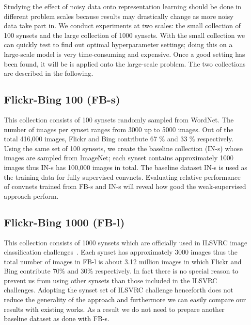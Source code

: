 \documentclass[preprint,12pt]{elsarticle}
\begin{document}
Studying the effect of noisy data onto representation learning should be done in different problem scales because results may drastically change as more noisy data take part in. We conduct experiments at two scales: the small collection of 100 synsets and the large collection of 1000 synsets. With the small collection we can quickly test to find out optimal hyperparameter settings; doing this on a large-scale model is very time-consuming and expensive. Once a good setting has been found, it will be is applied onto the large-scale problem. The two collections are described in the following.
\subsection{Flickr-Bing 100 (FB-s)} 
This collection consists of 100 synsets randomly sampled from WordNet. The number of images per synset ranges from 3000 up to 5000 images. Out of the total 416,000 images, Flickr and Bing contribute 67 \% and 33 \% respectively. Using the same set of 100 synsets, we create the baseline collection (IN-s) whose images are sampled from ImageNet; each synset contains approximately 1000 images thus IN-s has 100,000 images in total. The baseline dataset IN-s is used as the training data for fully supervised convnets. Evaluating relative performance of convnets trained from FB-s and IN-s will reveal how good the weak-supervised approach perform. 
\subsection{Flickr-Bing 1000 (FB-l)} 
This collection consists of 1000 synsets which are officially used in ILSVRC image classification challenges~\cite{ILSVRC15}. Each synset has approximately 3000 images thus the total number of images in FB-l is about 3.12 million images in which Flickr and Bing contribute 70\% and 30\% respectively. In fact there is no special reason to prevent us from using other synsets than those included in the ILSVRC challenges. Adopting the synset set of ILSVRC challenge henceforth does not reduce the generality of the approach and furthermore we can easily compare our results with existing works. As a result we do not need to prepare another baseline dataset as done with FB-s.
\end{document}
